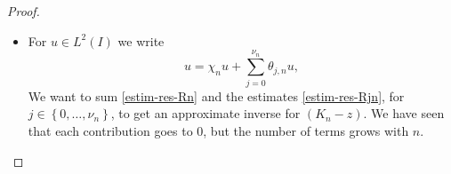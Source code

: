\documentclass[JEP,XML,SOM,Unicode]{cedram}
\let\mathcal\mathscr
\newcommand{\Psfrac}[2]{(\sfrac{#1}{#2})}
\theoremstyle{plain}
\theoremstyle{definition}
\newcommand {\limt}[2]{\xrightarrow[#1 \to #2]{}}
\newcommand{\abs}[1]{\vert #1\vert}
\newcommand{\nr}[1]{\Vert #1\Vert}
\newcommand{\Ii}[2] {\left\{ #1,\dots,#2 \right\}}
\newcommand{\inv}{^{-1}}
\newcommand{\1}{\mathds 1}
\let\Re\relax
\DeclareMathOperator{\Re}{\mathsf{Re}\mkern2mu}
\def\C{\mathbb{C}}
\newcommand{\N}{\mathbb{N}}
\let\g\gamma
\let\th\theta
\let\h\chi
\newcommand{\Lc}{{\mathcal L}}
\begin{document}
\begin{proof}
\begin{itemize}
For $j \in \Ii 1 {\nu_n-1}$ we set $\1_j = \1_I$. We also denote by $\1_0$ the operator which maps $u \in L^2(-\ell_-,+\infty)$ to its restriction on $I$, and by $\1_{\nu_n}$ the operator which maps $u \in L^2(-\infty,\ell_+)$ to its restriction to $I$. For $z \in \C_n^-$ we set
\begin{align*}
R_{j,n}(z) &= \1_j \bigl(A_{j,n}-z \bigr)\inv \1_j^*
\\
\tag*{and}
T_{j,n}(z) &= R_{j,n}(z) \theta_{j,n} (K_n-z) - \theta_{j,n}.
\end{align*}
We proceed as above. For $j \in \Ii 0 {\nu_n}$ we have
\begin{equation*}
R_{j,n}(z) \theta_{j,n} (K_n-z)u = \theta_{j,n} u+ i n R_{j,n}(z) \theta_{j,n} r_{j,n} u - R_{j,n}(z) \th_{j,n}'' u + 2 R_{j,n}(z) \partial_y (\th_{j,n}'u),
\end{equation*}
where
\[
r_{j,n}(y) = q^2(y) - q^2(a_{j,n}) - 2\, (y-a_{j,n}) q'(a_{j,n}) q(a_{j,n}).
\]
Let $n \in \N^*$ and $j \in \Ii 0 {\nu_n}$ such that $\theta_{j,n} \neq 0$. Then we have $2n q'(a_{j,n}) \vert q(a_{j,n})\vert \gtrsim n^{1-\rho}$ and hence, for $z \in \C_n^-$ (in particular $\Re(z) \leq \g n^{\sfrac 12} \ll n^{\Psfrac 23(1-\rho)}$), Proposition~\ref{prop-Airy-R+} gives
\begin{equation} \label{estim-res-Ajn}
\nr{R_{j,n}(z)}_{\Lc(L^2(I))} \lesssim n^{-\Psfrac 23(1-\rho)}.
\end{equation}
Then, as above we have $\abs{\tilde r_{j,n}(y) \theta_{j,n}(y)} \lesssim n^{-2\tilde \rho}$ so
\[
n \nr{ R_{j,n}(z) \tilde r_{j,n} \theta_{j,n}}_{\Lc(L^2(I))} \lesssim n^{1-2\tilde \rho - \Psfrac 23(1-\rho)} \limt n {+\infty} 0.
\]
Moreover,
\begin{align*}
\nr{R_{j,n}(z) \th_{j,n}'' u }_{L^2(I)} &\lesssim n^{2\tilde \rho - \Psfrac 23 (1-\rho)} \nr{u}_{L^2(I)},\\
\nr{R_{j,n}(z) (\th'_{j,n} u)'}_{L^2(I)} &\lesssim n^{\tilde \rho - \Psfrac 13(1-\rho)} \nr{u}_{L^2(I)}.
\end{align*}
All these estimates being uniform with respect to $j \in \Ii 0 {\nu_n}$, we finally get
\begin{equation} \label{estim-res-Rjn}
\sup_{z \in \C_n^-} \sup_{0\leq j \leq \nu_n} \nr{T_{j,n}(z)}_{\Lc(L^2(I))} \limt n {+\infty} 0.
\end{equation}

\item
For $u \in L^2(I)$ we write
\[
u = \h_n u + \sum_{j=0}^{\nu_n} \th_{j,n} u,
\]
We want to sum \eqref{estim-res-Rn} and the estimates \eqref{estim-res-Rjn}, for $j \in \Ii 0 {\nu_n}$, to get an approximate inverse for $(K_n-z)$. We have seen that each contribution goes to 0, but the number of terms grows with $n$.


\end{itemize}
\end{proof}
\end{document}
